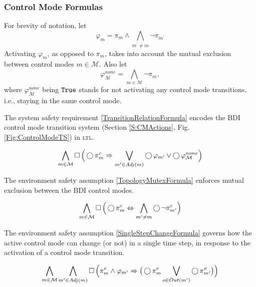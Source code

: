 
\subsubsection{Control Mode Formulas}

For brevity of notation, let $$\varphi_m = \pi_m \wedge \bigwedge_{m^\prime \neq m} \lnot \pi_{m^\prime}$$
Activating $\varphi_m$, as opposed to $\pi_m$, takes into account the mutual exclusion between control modes $m \in \mathcal{M}$.
Also let $$\varphi_\mathcal{M}^{none} = \bigwedge_{m \in \mathcal{M}} \lnot \pi_m,$$
where $\varphi_\mathcal{M}^{none}$ being $\mathtt{True}$ stands for not activating any control mode transitions, i.e., staying in the same control mode.

The system safety requirement \eqref{TransitionRelationFormula} encodes the BDI control mode transition system (Section \ref{S:CMActions}, Fig. \ref{Fig:ControlModeTS}) in \textsc{ltl}.

\begin{equation}\label{TransitionRelationFormula}
	\bigwedge \limits_{m \in \mathcal{M}} \operatorname{\Box} \Big( \operatorname{\bigcirc} \pi_m^c \Rightarrow \bigvee \limits_{m^\prime \in Adj(m)} \operatorname{\bigcirc} \varphi_{m^\prime} \vee \operatorname{\bigcirc} \varphi_\mathcal{M}^{none} \Big)
\end{equation}

The environment safety assumption \eqref{TopologyMutexFormula} enforces mutual exclusion between the BDI control modes.

\begin{equation}\label{TopologyMutexFormula}
	\bigwedge \limits_{m \in \mathcal{M}} \operatorname{\Box} \Big( \operatorname{\bigcirc} \pi_m^c \Leftrightarrow \bigwedge \limits_{m^\prime \neq m} \operatorname{\bigcirc} \lnot \pi_{m^\prime}^c \Big)
\end{equation}

The environment safety assumption \eqref{SingleStepChangeFormula} governs how the active control mode can change (or not) in a single time step, in response to the activation of a control mode transition.

\begin{equation}\label{SingleStepChangeFormula}
	\bigwedge \limits_{m \in \mathcal{M}} \bigwedge \limits_{m^\prime \in Adj(m)} \operatorname{\Box} \Big( \pi_m^c \wedge  \varphi_{m^\prime} \Rightarrow \big( \operatorname{\bigcirc} \pi_{m}^c \bigvee \limits_{o \in Out(m^\prime)} \operatorname{\bigcirc} \pi_{m^\prime}^o \big) \Big)
\end{equation}

